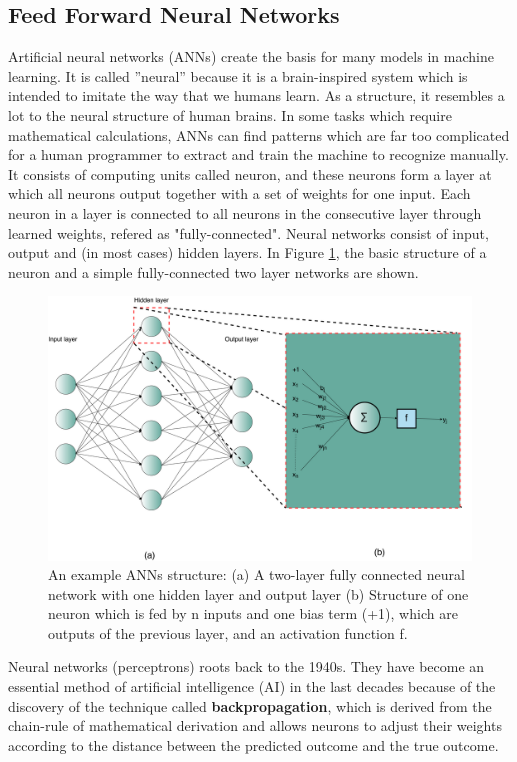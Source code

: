 \subsection{Feed Forward Neural Networks}
\label{subsec:ffnn}
Artificial neural networks (ANNs) create the basis for many models in machine learning.  It is called ”neural”  because it is a brain-inspired system which is intended to imitate the way that we humans learn.  As a structure, it resembles a lot to the neural structure of human brains.  In some tasks which require mathematical calculations,  ANNs can find patterns which are far too complicated for a human programmer to extract and train the machine to recognize manually.  It consists of computing units called neuron,  and these neurons form a layer at which all neurons output together with a set of weights for one input. Each neuron in a layer is connected to all neurons in the consecutive layer through learned weights, refered as "fully-connected".  Neural networks consist of input,  output and (in most cases) hidden layers.  In Figure \ref{fig:ff}, the basic structure of a neuron and a simple fully-connected two layer networks are shown.\\
\begin{figure}[h]
	\centering
  \includegraphics[width=\linewidth]{figures/ff_structure}
  \caption{An example ANNs structure: (a) A two-layer fully connected neural network with one hidden layer and output layer (b)  Structure of one neuron which is fed by n inputs and one bias term  (+1),  which are outputs of the previous layer, and an activation function f.}
  \label{fig:ff}
\end{figure}

Neural networks (perceptrons) roots back to the 1940s. They have become an essential method of artificial intelligence (AI)  in the last decades because of the discovery of the technique called \textbf{backpropagation}, which is derived from the chain-rule of mathematical derivation and allows neurons to adjust their weights according to the distance between the predicted outcome and the true outcome.\\

